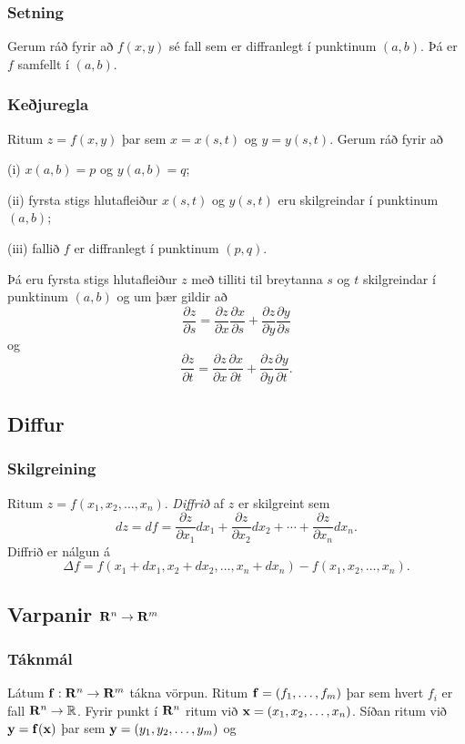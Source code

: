 \subsubsection{Setning }
  Gerum ráð fyrir að $f(x,y)$ sé fall sem er
diffranlegt í punktinum $(a,b)$.  Þá er $f$ samfellt í $(a,b)$.




\subsubsection{Keðjuregla }
 Ritum $z=f(x,y)$ þar sem $x=x(s,t)$ og
$y=y(s,t)$.  Gerum ráð fyrir að 

(i) $x(a,b)=p$ og $y(a,b)=q$;

(ii) fyrsta stigs hlutafleiður $x(s,t)$ og $y(s,t)$ eru skilgreindar í
punktinum $(a,b)$;

(iii)  fallið $f$ er diffranlegt í punktinum $(p,q)$.

Þá eru fyrsta stigs hlutafleiður $z$ með tilliti til breytanna $s$ og
$t$ skilgreindar í punktinum $(a,b)$ og um þær gildir að 
$$\frac{\partial z}{\partial s}=
\frac{\partial z}{\partial x}\frac{\partial x}{\partial s}
+\frac{\partial z}{\partial y}\frac{\partial y}{\partial s}$$
og
$$\frac{\partial z}{\partial t}=
\frac{\partial z}{\partial x}\frac{\partial x}{\partial t}
+\frac{\partial z}{\partial y}\frac{\partial y}{\partial t}.$$




\subsection{Diffur} 

\subsubsection{Skilgreining }
  Ritum $z=f(x_1, x_2, \ldots, x_n)$.  {\em
  Diffrið} af $z$ er skilgreint sem 
$$dz=df=\frac{\partial z}{\partial x_1}dx_1
+\frac{\partial z}{\partial x_2}dx_2
+\cdots+\frac{\partial z}{\partial x_n}dx_n.$$
Diffrið er nálgun á 
$$\Delta f=f(x_1+dx_1, x_2+dx_2,\ldots,
x_n+dx_n)-f(x_1,x_2,\ldots,x_n).$$




\subsection{Varpanir $\mbox{${\bf R}^n$}\rightarrow\mbox{${\bf R}^m$}$} 
\subsubsection{Táknmál }
Látum $\mbox{${\bf f}$}:\mbox{${\bf R}^n$}\rightarrow\mbox{${\bf R}^m$}$ tákna vörpun.
Ritum $\mbox{${\bf f}$}=(f_1,\ldots,f_m)$ þar sem hvert $f_i$ er fall
$\mbox{${\bf R}^n$}\rightarrow{\mathbb R}$.  Fyrir punkt í $\mbox{${\bf R}^n$}$ ritum við
$\mbox{${\bf x}$}=(x_1,x_2,\ldots,x_n)$.  Síðan ritum við $\mbox{${\bf y}$}=\mbox{${\bf f}$}(\mbox{${\bf x}$})$ þar sem 
$\mbox{${\bf y}$}=(y_1,y_2,\ldots,y_m)$ og 




